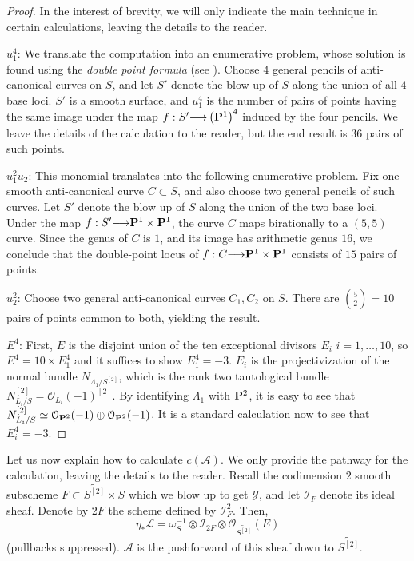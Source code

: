 \documentclass[12pt,reqno]{amsart}
\renewcommand{\to}{{\longrightarrow}}
\numberwithin{equation}{section}
\renewcommand{\O}{\mathcal O}
\newcommand{\td}{\widetilde}
\begin{document}
\begin{proof} In the interest of brevity, we will only indicate the
  main technique in certain calculations, leaving the details to the reader.

  $u_{1}^{4}$: We translate the computation into an enumerative
  problem, whose solution is found using the {\sl double point
    formula} (see \cite[~Theorem 2]{fulton1978note}).  Choose $4$ general pencils
  of anti-canonical curves on $S$, and let $S'$ denote the blow up of
  $S$ along the union of all $4$ base loci.  $S'$ is a smooth surface,
  and $u_{1}^{4}$ is the number of pairs of points having the same
  image under the map $f: S' \to \left( \P^{1} \right)^{4}$ induced by
  the four pencils.  We leave the details of the calculation to the
  reader, but the end result is $36$ pairs of such points.

  $u_{1}^{2}u_{2}$: This monomial translates into the following
  enumerative problem.  Fix one smooth anti-canonical curve
  $C \subset S$, and also choose two general pencils of such curves.
  Let $S'$ denote the blow up of $S$ along the union of the two base
  loci.  Under the map $f: S' \to \P^{1} \times \P^{1}$, the curve $C$
  maps birationally to a $(5,5)$ curve. Since the genus of $C$ is $1$,
  and its image has arithmetic genus $16$, we conclude that the
  double-point locus of $f: C \to \P^{1} \times \P^{1}$ consists of
  $15$ pairs of points.

  $u_{2}^{2}$: Choose two general anti-canonical curves $C_{1},C_{2}$
  on $S$.  There are ${5 \choose 2} = 10$ pairs of points common to
  both, yielding the result.

  $E^{4}$: First, $E$ is the disjoint union of the ten exceptional
  divisors $E_{i}$ $i=1, \dots, 10$, so $E^{4} = 10 \times E_{1}^{4}$
  and it suffices to show $E_{1}^{4} = -3$.  $E_{i}$ is the
  projectivization of the normal bundle $N_{\Lambda_{1}/S^{[2]}}$,
  which is the rank two tautological bundle
  $N_{L_{i}/S}^{[2]} = \O_{L_{i}}(-1)^{[2]}$.  By identifying
  $\Lambda_{1}$ with $\P^{2}$, it is easy to see that
  $N_{L_{i}/S}^{[2]} \simeq \O_{\P^{2}}(-1) \oplus
  \O_{\P^{2}}(-1)$. It is a standard calculation now to see that
  $E_{i}^{4} = -3$.
\end{proof}

Let us now explain how to calculate $c(\mathcal{A})$.  We only provide
the pathway for the calculation, leaving the details to the
reader. Recall the codimension $2$ smooth subscheme
$F \subset \td{S^{[2]}} \times S$ which we blow up to get
$\mathcal{Y}$, and let $\mathcal{I}_{F}$ denote its ideal sheaf.
Denote by $2F$ the scheme defined by $\mathcal{I}_{F}^{2}$.  Then, \
\[\eta_{*}\mathcal{L} = \omega_{S}^{-1} \otimes \mathcal{I}_{2F} \otimes \O_{\td{S^{[2]}}}(E)\]
(pullbacks suppressed).  $\mathcal{A}$ is the pushforward of this
sheaf down to $\td{S^{[2]}}$.
\end{document}

